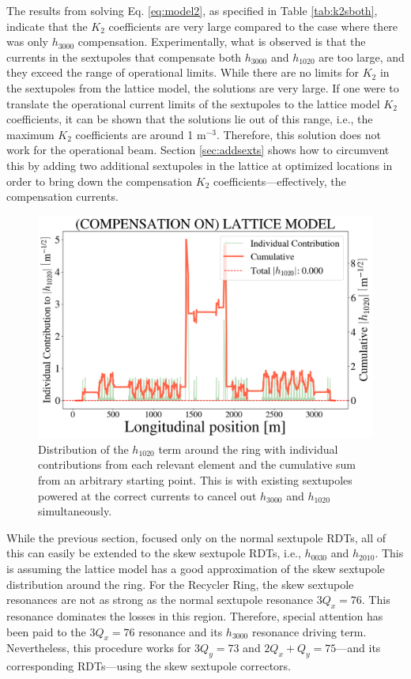 The results from solving Eq. \ref{eq:model2}, as specified in Table \ref{tab:k2sboth}, indicate that the $K_2$ coefficients are very large compared to the case where there was only $h_{3000}$ compensation. Experimentally, what is observed is that the currents in the sextupoles that compensate both $h_{3000}$ and $h_{1020}$ are too large, and they exceed the range of operational limits. While there are no limits for $K_2$ in the sextupoles from the lattice model, the solutions are very large. If one were to translate the operational current limits of the sextupoles to the lattice model $K_2$ coefficients, it can be shown that the solutions lie out of this range, i.e., the maximum $K_2$ coefficients are around 1 m$^{-3}$. Therefore, this solution does not work for the operational beam. Section \ref{sec:addsexts} shows how to circumvent this by adding two additional sextupoles in the lattice at optimized locations in order to bring down the compensation $K_2$ coefficients---effectively, the compensation currents.

\begin{figure}[H]
    \centering
    \includegraphics[width=\columnwidth]{chapter4/old_config_h1020.png}
    \caption{Distribution of the $h_{1020}$ term around the ring with individual contributions from each relevant element and the cumulative sum from an arbitrary starting point. This is with existing sextupoles powered at the correct currents to cancel out $h_{3000}$ and $h_{1020}$ simultaneously.}
    \label{fig:h1020oldconfig}
\end{figure}

While the previous section, focused only on the normal sextupole RDTs, all of this can easily be extended to the skew sextupole RDTs, i.e., $h_{0030}$ and $h_{2010}$. This is assuming the lattice model has a good approximation of the skew sextupole distribution around the ring. For the Recycler Ring, the skew sextupole resonances are not as strong as the normal sextupole resonance $3Q_x=76$. This resonance dominates the losses in this region. Therefore, special attention has been paid to the $3Q_x=76$ resonance and its $h_{3000}$ resonance driving term. Nevertheless, this procedure works for $3Q_y=73$ and $2Q_x+Q_y=75$---and its corresponding RDTs---using the skew sextupole correctors.

